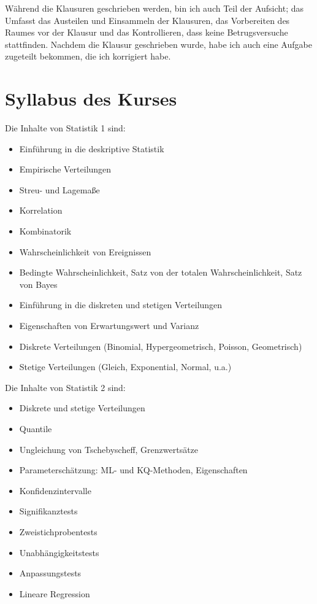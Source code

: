 \documentclass{article}
\begin{document}
	Während die Klausuren geschrieben werden, bin ich auch Teil der Aufsicht; das Umfasst das Austeilen und Einsammeln der Klausuren, das Vorbereiten des Raumes vor der Klausur und das Kontrollieren, dass keine Betrugsversuche stattfinden. Nachdem die Klausur geschrieben wurde, habe ich auch eine Aufgabe zugeteilt bekommen, die ich korrigiert habe.

	\section*{Syllabus des Kurses}
	Die Inhalte von Statistik 1 sind:
	\begin{itemize}
		\item Einführung in die deskriptive Statistik
		\item Empirische Verteilungen
		\item Streu- und Lagemaße
		\item Korrelation
		\item Kombinatorik
		\item Wahrscheinlichkeit von Ereignissen
		\item Bedingte Wahrscheinlichkeit, Satz von der totalen Wahrscheinlichkeit, Satz von Bayes
		\item Einführung in die diskreten und stetigen Verteilungen
		\item Eigenschaften von Erwartungswert und Varianz
		\item Diskrete Verteilungen (Binomial, Hypergeometrisch, Poisson, Geometrisch)
		\item Stetige Verteilungen (Gleich, Exponential, Normal, u.a.)
	\end{itemize}
	Die Inhalte von Statistik 2 sind:
	\begin{itemize}
		\item Diskrete und stetige Verteilungen
		\item Quantile
		\item Ungleichung von Tschebyscheff, Grenzwertsätze
		\item Parameterschätzung: ML- und KQ-Methoden, Eigenschaften
		\item Konfidenzintervalle
		\item Signifikanztests
		\item Zweistichprobentests
		\item Unabhängigkeitstests
		\item Anpassungstests
		\item Lineare Regression
	\end{itemize}
	
\end{document}
